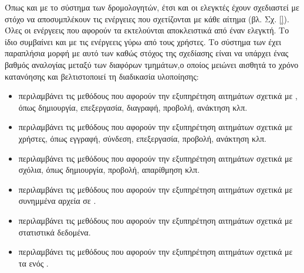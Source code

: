 Όπως και με το σύστημα των δρομολογητών, έτσι και οι ελεγκτές έχουν σχεδιαστεί με στόχο να αποσυμπλέκουν τις ενέργειες που σχετίζονται με κάθε αίτημα (βλ. Σχ. \ref{}). Όλες οι ενέργεεις που αφορούν τα  εκτελούνται αποκλειστικά από έναν ελεγκτή. Το ίδιο συμβαίνει και με τις ενέργεεις γύρω από τους χρήστες. Το σύστημα των  έχει παραπλήσια μορφή με αυτό των  καθώς στόχος της σχεδίασης είναι να υπάρχει ένας βαθμός αναλογίας μεταξύ των διαφόρων τμημάτων,ο οποίος μειώνει αισθητά το χρόνο κατανόησης και βελτιστοποιεί τη διαδικασία υλοποίησης:

\begin{itemize}
    \item {} περιλαμβάνει τις μεθόδους που αφορούν την εξυπηρέτηση αιτημάτων σχετικά με , όπως δημιουργία, επεξεργασία, διαγραφή, προβολή, ανάκτηση κλπ.
    \item {} περιλαμβάνει τις μεθόδους που αφορούν την εξυπηρέτηση αιτημάτων σχετικά με χρήστες, όπως εγγραφή, σύνδεση, επεξεργασία, προβολή, ανάκτηση κλπ.
    \item {} περιλαμβάνει τις μεθόδους που αφορούν την εξυπηρέτηση αιτημάτων σχετικά με σχόλια, όπως δημιουργία, προβολή, απαρίθμηση κλπ.
    \item {} περιλαμβάνει τις μεθόδους που αφορούν την εξυπηρέτηση αιτημάτων σχετικά με συνημμένα αρχεία σε .
    \item {} περιλαμβάνει τις μεθόδους που αφορούν την εξυπηρέτηση αιτημάτων σχετικά με στατιστικά δεδομένα.
    \item {} περιλαμβάνει τις μεθόδους που αφορούν την εξυπηρέτηση αιτημάτων σχετικά με τα  ενός .
\end{itemize}

